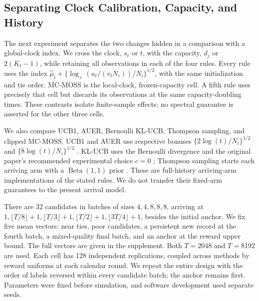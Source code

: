 \subsection{Separating Clock Calibration, Capacity, and History}
\label{sec:mechanisms-experiments}

The next experiment separates the two changes hidden in a comparison with a
global-clock index.  We cross the clock, $s_t$ or $t$, with the capacity,
$d_j$ or $2(K_t-1)$, while retaining all observations in each of the four
rules.  Every rule uses the index
$\widehat\mu_i+\{\log_+(u_t/(v_tN_i))/N_i\}^{1/2}$, with the same
initialization and tie order.  MC-MOSS is the local-clock, frozen-capacity
cell.  A fifth rule uses precisely that cell but discards its observations
at the same capacity-doubling times.  These contrasts isolate finite-sample
effects; no spectral guarantee is asserted for the other three cells.

We also compare UCB1, AUER, Bernoulli KL-UCB, Thompson sampling, and clipped
MC-MOSS.  UCB1 and AUER use respective bonuses
$\{2\log(t)/N_i\}^{1/2}$ and $\{8\log(t)/N_i\}^{1/2}$
\citep{auer2002finite,kleinberg2008sleeping}.
KL-UCB uses the Bernoulli divergence and the original paper's recommended
experimental choice $c=0$ \citep{garivier2011kl}; Thompson sampling starts
each arriving arm with a $\operatorname{Beta}(1,1)$ prior
\citep{agrawal2012thompson}.  These are full-history arriving-arm
implementations of the stated rules.  We do not transfer their fixed-arm
guarantees to the present arrival model.

There are 32 candidates in batches of sizes $4,4,8,8,8$, arriving at
$1,\lfloor T/8\rfloor+1,\lfloor T/3\rfloor+1,
\lfloor T/2\rfloor+1,\lfloor3T/4\rfloor+1$, besides the initial anchor.
We fix five mean vectors: near ties, poor candidates, a persistent new
record at the fourth batch, a mixed-quality final batch, and an anchor at
the reward upper bound.  The full vectors are given in the supplement.
Both $T=2048$ and $T=8192$ are used.  Each cell has 128 independent
replications, coupled across methods by reward uniforms at each calendar
round.  We repeat the entire design with the order of labels reversed
within every candidate batch; the anchor remains first.  Parameters were
fixed before simulation, and software development used separate seeds.



